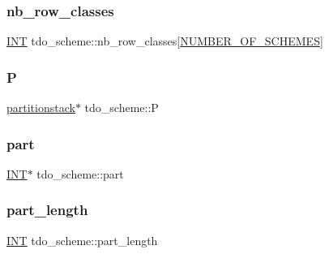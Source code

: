 \mbox{\label{classtdo__scheme_af758b48afca3437d5a036289fa865634}} 
\subsubsection{\texorpdfstring{nb\+\_\+row\+\_\+classes}{nb\_row\_classes}}
{\footnotesize\ttfamily \mbox{\hyperlink{galois_8h_a09fddde158a3a20bd2dcadb609de11dc}{I\+NT}} tdo\+\_\+scheme\+::nb\+\_\+row\+\_\+classes\mbox{[}\mbox{\hyperlink{incidence_8h_a27f25725c4772efe473058135daeba55}{N\+U\+M\+B\+E\+R\+\_\+\+O\+F\+\_\+\+S\+C\+H\+E\+M\+ES}}\mbox{]}}

\mbox{\label{classtdo__scheme_ac9beab3ff56b5145a9b141f3b1bf75d0}} 
\subsubsection{\texorpdfstring{P}{P}}
{\footnotesize\ttfamily \mbox{\hyperlink{classpartitionstack}{partitionstack}}$\ast$ tdo\+\_\+scheme\+::P}

\mbox{\label{classtdo__scheme_a670c75bc7276a4dac4c12656e3906924}} 
\subsubsection{\texorpdfstring{part}{part}}
{\footnotesize\ttfamily \mbox{\hyperlink{galois_8h_a09fddde158a3a20bd2dcadb609de11dc}{I\+NT}}$\ast$ tdo\+\_\+scheme\+::part}

\mbox{\label{classtdo__scheme_a38ee3bf23440a8869dc68d92097dca85}} 
\subsubsection{\texorpdfstring{part\+\_\+length}{part\_length}}
{\footnotesize\ttfamily \mbox{\hyperlink{galois_8h_a09fddde158a3a20bd2dcadb609de11dc}{I\+NT}} tdo\+\_\+scheme\+::part\+\_\+length}

